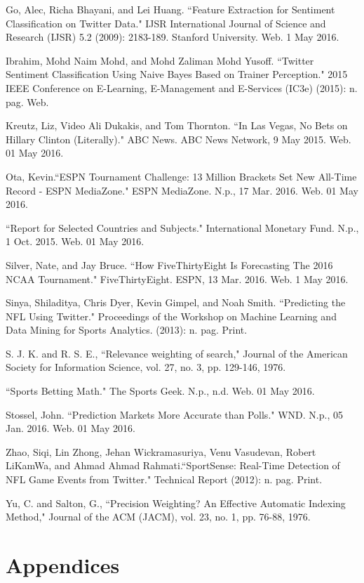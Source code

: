 \documentclass[12pt]{article}
\begin{document}
\begin{doublespacing}
Go, Alec, Richa Bhayani, and Lei Huang. ``Feature Extraction for Sentiment Classification 	on Twitter Data." IJSR International Journal of Science and Research (IJSR) 5.2 	(2009): 2183-189. Stanford University. Web. 1 May 2016.

Ibrahim, Mohd Naim Mohd, and Mohd Zaliman Mohd Yusoff. ``Twitter Sentiment 		Classification Using Naive Bayes Based on Trainer Perception." 2015 IEEE 		Conference on E-Learning, E-Management and E-Services (IC3e) (2015): n. pag. 	Web.

Kreutz, Liz, Video Ali Dukakis, and Tom Thornton. ``In Las Vegas, No Bets on Hillary 	Clinton (Literally)." ABC News. ABC News Network, 9 May 2015. Web. 01 May 		2016.

Ota, Kevin.``ESPN Tournament Challenge: 13 Million Brackets Set New All-Time Record - 	ESPN MediaZone." ESPN MediaZone. N.p., 17 Mar. 2016. Web. 01 May 2016.

``Report for Selected Countries and Subjects." International Monetary Fund. N.p., 1 Oct. 	2015. Web. 01 May 2016.

Silver, Nate, and Jay Bruce. ``How FiveThirtyEight Is Forecasting The 2016 NCAA 		Tournament." FiveThirtyEight. ESPN, 13 Mar. 2016. Web. 1 May 2016.

Sinya, Shiladitya, Chris Dyer, Kevin Gimpel, and Noah Smith. ``Predicting the NFL Using 	Twitter." Proceedings of the Workshop on Machine Learning and Data Mining for 	Sports Analytics. (2013): n. pag. Print.

S. J. K. and R. S. E., ``Relevance weighting of search," Journal of the American 		Society for Information Science, vol. 27, no. 3, pp. 129-146, 1976. 

``Sports Betting Math." The Sports Geek. N.p., n.d. Web. 01 May 2016.

Stossel, John. ``Prediction Markets More Accurate than Polls." WND. N.p., 05 Jan. 		2016. Web. 01 May 2016.

Zhao, Siqi, Lin Zhong, Jehan Wickramasuriya, Venu Vasudevan, Robert LiKamWa, and 	Ahmad Ahmad Rahmati.``SportSense: Real-Time Detection of NFL Game Events 	from Twitter." Technical Report (2012): n. pag. Print.

Yu, C. and Salton, G., ``Precision Weighting? An Effective Automatic Indexing Method," 	Journal of the ACM (JACM), vol. 23, no. 1, pp. 76-88, 1976. 

\newpage

\section{Appendices}


\end{doublespacing}
\end{document}
